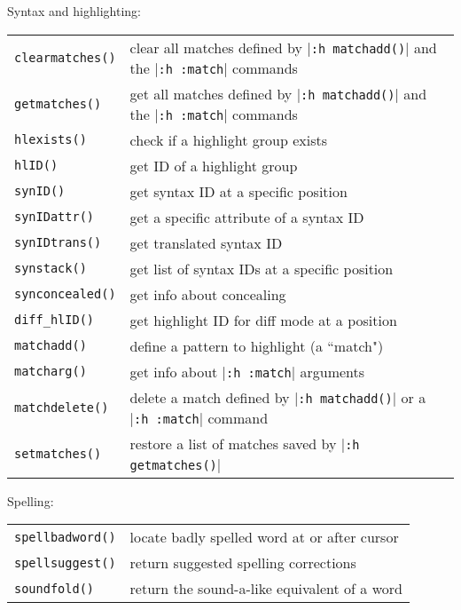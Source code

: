 Syntax and highlighting:
\label{syntax-functions}
\label{highlighting-functions}
\begin{center} \begin{tabular}{l l}
				\texttt{clearmatches()} & clear all matches defined by |\texttt{:h matchadd()}| and the |\texttt{:h :match}| commands \\
				\texttt{getmatches()} & get all matches defined by |\texttt{:h matchadd()}| and the |\texttt{:h :match}| commands \\
				\texttt{hlexists()} & check if a highlight group exists \\
				\texttt{hlID()} & get ID of a highlight group \\
				\texttt{synID()} & get syntax ID at a specific position \\
				\texttt{synIDattr()} & get a specific attribute of a syntax ID \\
				\texttt{synIDtrans()} & get translated syntax ID \\
				\texttt{synstack()} & get list of syntax IDs at a specific position \\
				\texttt{synconcealed()} & get info about concealing \\
				\texttt{diff\_hlID()} & get highlight ID for diff mode at a position \\
				\texttt{matchadd()} & define a pattern to highlight (a ``match") \\
				\texttt{matcharg()} & get info about |\texttt{:h :match}| arguments \\
				\texttt{matchdelete()} & delete a match defined by |\texttt{:h matchadd()}| or a |\texttt{:h :match}| command \\
				\texttt{setmatches()} & restore a list of matches saved by |\texttt{:h getmatches()}| \\
\end{tabular} \end{center}

Spelling:
\label{spell-functions}
\begin{center} \begin{tabular}{l l}
				\texttt{spellbadword()} & locate badly spelled word at or after cursor \\
				\texttt{spellsuggest()} & return suggested spelling corrections \\
				\texttt{soundfold()} & return the sound-a-like equivalent of a word \\
\end{tabular} \end{center}

